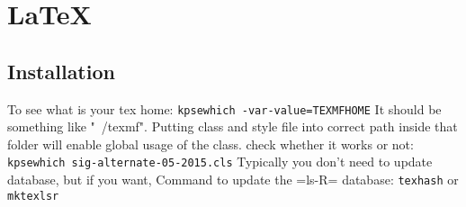 \section{\LaTeX}

\subsection{Installation}
To see what is your tex home: \texttt{kpsewhich -var-value=TEXMFHOME}
It should be something like "~/texmf".  Putting class and style file
into correct path inside that folder will enable global usage of the
class.  check whether it works or not: \texttt{kpsewhich
  sig-alternate-05-2015.cls} Typically you don't need to update
database, but if you want, Command to update the =ls-R= database:
\texttt{texhash} or \texttt{mktexlsr}

